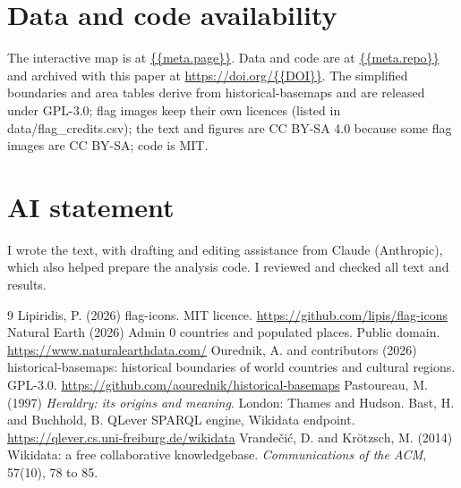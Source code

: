 \documentclass[11pt,a4paper]{article}
\begin{document}
\section*{Data and code availability}
The interactive map is at \url{{{meta.page}}}. Data and code are at \url{{{meta.repo}}} and archived with this paper at \url{https://doi.org/{{DOI}}}. The simplified boundaries and area tables derive from historical-basemaps and are released under GPL-3.0; flag images keep their own licences (listed in data/flag\_credits.csv); the text and figures are CC BY-SA 4.0 because some flag images are CC BY-SA; code is MIT.

\section*{AI statement}
I wrote the text, with drafting and editing assistance from Claude (Anthropic), which also helped prepare the analysis code. I reviewed and checked all text and results.

\begin{thebibliography}{9}
 Lipiridis, P. (2026) flag-icons. MIT licence. \url{https://github.com/lipis/flag-icons}
 Natural Earth (2026) Admin 0 countries and populated places. Public domain. \url{https://www.naturalearthdata.com/}
 Ourednik, A. and contributors (2026) historical-basemaps: historical boundaries of world countries and cultural regions. GPL-3.0. \url{https://github.com/aourednik/historical-basemaps}
 Pastoureau, M. (1997) \emph{Heraldry: its origins and meaning}. London: Thames and Hudson.
 Bast, H. and Buchhold, B. QLever SPARQL engine, Wikidata endpoint. \url{https://qlever.cs.uni-freiburg.de/wikidata}
 Vrande\v{c}i\'c, D. and Kr\"otzsch, M. (2014) Wikidata: a free collaborative knowledgebase. \emph{Communications of the ACM}, 57(10), 78 to 85.
\end{thebibliography}
\end{document}
